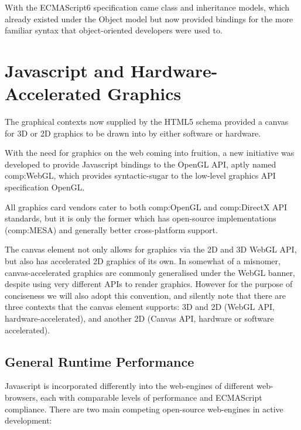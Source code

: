 With the ECMAScript6 specification came class and inheritance models, which already existed under the Object model but now provided bindings for the more familiar syntax that object-oriented developers were used to.


\section{Javascript and Hardware-Accelerated Graphics}

The graphical contexts now supplied by the HTML5 schema provided a canvas for 3D or 2D graphics to be drawn into by either software or hardware.

With the need for graphics on the web coming into fruition, a new initiative was developed to provide Javascript bindings to the OpenGL API\citep{opengl}, aptly named \gls{comp:WebGL}\citep{webgl}, which provides syntactic-sugar to the low-level graphics API specification OpenGL.

All graphics card vendors cater to both \gls{comp:OpenGL} and \gls{comp:DirectX} API standards\citep{directx}, but it is only the former which has open-source implementations (\gls{comp:MESA}) and generally better cross-platform support. 

The canvas element not only allows for graphics via the 2D and 3D WebGL API, but also has accelerated 2D graphics of its own. In somewhat of a misnomer, canvas-accelerated graphics are commonly generalised under the WebGL banner, despite using very different APIs to render graphics. However for the purpose of conciseness we will also adopt this convention, and silently note that there are three contexts that the canvas element supports: 3D and 2D (WebGL API, hardware-accelerated), and another 2D (Canvas API, hardware or software accelerated).

\subsection{General Runtime Performance}

Javascript is incorporated differently into the web-engines of different web-browsers, each with comparable levels of performance and ECMAScript compliance. There are two main competing open-source web-engines in active development:

\begin{description}
\end{description}

